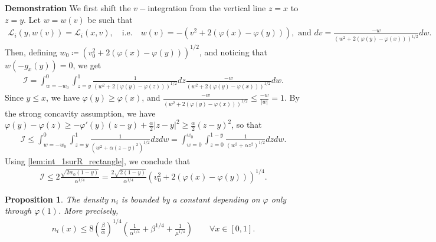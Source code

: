 \documentclass{article}
\newtheorem{proposition}{Proposition}[section]
\numberwithin{equation}{section}
\newcommand{\myproof}[1]{
	\noindent \textbf{Demonstration}
	{\small	#1 \hfill \qedsymbol}
}
\begin{document}
\myproof{
	We first shift the $v-$integration from the vertical line $z=x$ to $z=y$. Let $w = w(v)$ be such that
	\begin{align*}
		\mathcal{L}_i(y,w(v)) = \mathcal{L}_i(x,v), \quad \text{i.e.} \quad w(v) = -\left(v^2 + 2 \left(\varphi(x) - \varphi(y)\right)\right), \text{ and } dv = \frac{-w}{\left(w^2 + 2 \left(\varphi(y) - \varphi(x)\right)\right)^{1/2}}  dw.
	\end{align*}
	Then, defining $w_0 \coloneqq \left(v_0^2 + 2 \left(\varphi(x) - \varphi(y)\right)\right)^{1/2}$, and noticing that $w(-g_x(y)) = 0$, we get
	\begin{align*}
		\mathcal{I} = \int_{w=-w_0}^{0} \int_{z=y}^{1} \frac{1}{\left(w^2 + 2 \left(\varphi(y) - \varphi(z)\right)\right)^{1/2}} dz \frac{-w}{\left(w^2 + 2 \left(\varphi(y) - \varphi(x)\right)\right)^{1/2}} dw.
	\end{align*}
	Since $y \leqslant x$, we have $\varphi(y) \geqslant \varphi(x)$, and $\frac{-w}{\left(w^2 + 2 \left(\varphi(y) - \varphi(x)\right)\right)^{1/2}} \leqslant \frac{-w}{|w|} = 1$. By the strong concavity assumption, we have $\varphi(y) - \varphi(z) \geqslant - \varphi'(y) (z - y) + \frac{\alpha}{2} |z - y|^2 \geqslant \frac{\alpha}{2} (z - y)^2$, so that
	\begin{align*}
		\mathcal{I} \leqslant \int_{w=-w_0}^{0} \int_{z=y}^{1} \frac{1}{\left(w^2 + \alpha (z- y)^2\right)^{1/2}} dz dw = \int_{w=0}^{w_0} \int_{z=0}^{1-y} \frac{1}{\left(w^2 + \alpha z^2\right)^{1/2}} dz dw.
	\end{align*}
	Using \cref{lem:int_1surR_rectangle}, we conclude that 
	\begin{align*}
		\mathcal{I} \leqslant 2 \frac{\sqrt{2 w_0 (1-y)}}{\alpha^{1/4}} = \frac{2\sqrt{2(1-y)}}{\alpha^{1/4}} \left(v_0^2 + 2 \left(\varphi(x) - \varphi(y)\right)\right)^{1/4}.
	\end{align*}
}

\begin{proposition}
	The density $n_i$ is bounded by a constant depending on $\varphi$ only through $\varphi(1)$. More precisely,
	\begin{align*}
		n_i(x) \leqslant 8 \left(\frac{\beta}{\alpha}\right)^{1/4} \left(\frac{1}{\alpha^{1/4}} + \beta^{1/4} + \frac{1}{\mu^{1/4}}\right) 
		\quad\quad\forall x \in[0,1].
	\end{align*}
\end{proposition}
\end{document}
